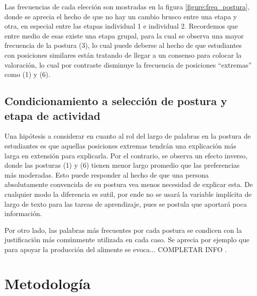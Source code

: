 \documentclass[
	spanish, %
	letterpaper, oneside
]{article}
\begin{document}
\newp Las frecuencias de cada elección son mostradas en la figura \ref{figure:freq_postura}, donde se aprecia el hecho de que no hay un cambio brusco entre una etapa y otra, en especial entre las etapas individual 1 e individual 2. Recordemos que entre medio de esas existe una etapa grupal, para la cual se observa una mayor frecuencia de la postura (3), lo cual puede deberse al hecho de que estudiantes con posiciones similares están tratando de llegar a un consenso para colocar la valoración, lo cual por contraste disminuye la frecuencia de posiciones ``extremas'' como (1) y (6).

\subsection{Condicionamiento a selección de postura y etapa de actividad}

Una hipótesis a considerar en cuanto al rol del largo de palabras en la postura de estudiantes es que aquellas posiciones extremas tendrán una explicación más larga en extensión para explicarla. Por el contrario, se observa un efecto inverso, donde las posturas (1) y (6) tienen menor largo promedio que las preferencias más moderadas. Esto puede responder al hecho de que una persona absolutamente convencida de su postura vea menos necesidad de explicar esta. De cualquier modo la diferencia es sutil, por ende no se usará la variable implícita de largo de texto para las tareas de aprendizaje, pues se postula que aportará poca información.



\newp Por otro lado, las palabras más frecuentes por cada postura se condicen con la justificación más comúnmente utilizada en cada caso. Se aprecia por ejemplo que para apoyar la producción del alimente se evoca... \color{red} COMPLETAR INFO \color{black}.




\section{Metodología}
\end{document}
